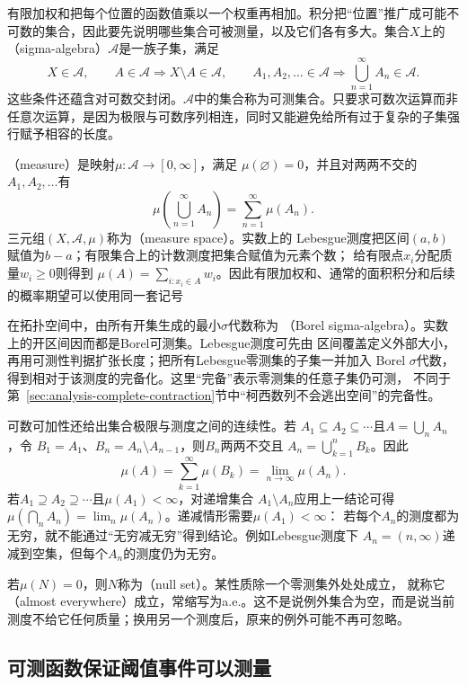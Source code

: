 有限加权和把每个位置的函数值乘以一个权重再相加。积分把“位置”推广成可能不可数的集合，因此要先说明哪些集合可被测量，以及它们各有多大。集合$X$上的
（sigma-algebra）$\mathcal{A}$是一族子集，满足
\[   X\in\mathcal{A},\qquad   A\in\mathcal{A}\Longrightarrow X\setminus A\in\mathcal{A},\qquad   A_1,A_2,\ldots\in\mathcal{A}   \Longrightarrow   \bigcup_{n=1}^{\infty}A_n\in\mathcal{A}. \]
这些条件还蕴含对可数交封闭。$\mathcal{A}$中的集合称为可测集合。只要求可数次运算而非任意次运算，是因为极限与可数序列相连，同时又能避免给所有过于复杂的子集强行赋予相容的长度。

（measure）是映射$\mu:\mathcal{A}\to[0,\infty]$，满足 $\mu(\varnothing)=0$，并且对两两不交的$A_1,A_2,\ldots$有
\[   \mu\left(\bigcup_{n=1}^{\infty}A_n\right)   =   \sum_{n=1}^{\infty}\mu(A_n). \]
三元组$(X,\mathcal{A},\mu)$称为（measure space）。实数上的 Lebesgue测度把区间$(a,b)$赋值为$b-a$；有限集合上的计数测度把集合赋值为元素个数； 给有限点$x_i$分配质量$w_i\geq0$则得到 $\mu(A)=\sum_{i:x_i\in A}w_i$。因此有限加权和、通常的面积积分和后续的概率期望可以使用同一套记号

在拓扑空间中，由所有开集生成的最小$\sigma$代数称为
（Borel sigma-algebra）。实数上的开区间因而都是Borel可测集。Lebesgue测度可先由
区间覆盖定义外部大小，再用可测性判据扩张长度；把所有Lebesgue零测集的子集一并加入
Borel $\sigma$代数，得到相对于该测度的完备化。这里“完备”表示零测集的任意子集仍可测，
不同于第~\ref{sec:analysis-complete-contraction}节中“柯西数列不会逃出空间”的完备性。

可数可加性还给出集合极限与测度之间的连续性。若
$A_1\subseteq A_2\subseteq\cdots$且$A=\bigcup_nA_n$，令
$B_1=A_1$、$B_n=A_n\setminus A_{n-1}$，则$B_n$两两不交且
$A_n=\bigcup_{k=1}^nB_k$。因此
\[
  \mu(A)
  =
  \sum_{k=1}^{\infty}\mu(B_k)
  =
  \lim_{n\to\infty}\mu(A_n).
\]
若$A_1\supseteq A_2\supseteq\cdots$且$\mu(A_1)<\infty$，对递增集合
$A_1\setminus A_n$应用上一结论可得
$\mu(\bigcap_nA_n)=\lim_n\mu(A_n)$。递减情形需要$\mu(A_1)<\infty$：
若每个$A_n$的测度都为无穷，就不能通过“无穷减无穷”得到结论。例如Lebesgue测度下
$A_n=(n,\infty)$递减到空集，但每个$A_n$的测度仍为无穷。

若$\mu(N)=0$，则$N$称为（null set）。某性质除一个零测集外处处成立， 就称它（almost everywhere）成立，常缩写为a.e.。这不是说例外集合为空，而是说当前测度不给它任何质量；换用另一个测度后，原来的例外可能不再可忽略。
\subsection{可测函数保证阈值事件可以测量}

